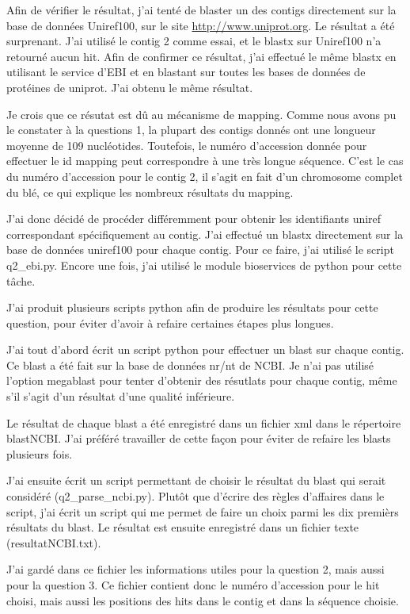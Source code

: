 \documentclass[10.9pt]{article} %
\begin{document}
Afin de vérifier le résultat, j'ai tenté de blaster un des contigs directement sur la base de données Uniref100,
sur le site \url{http://www.uniprot.org}. Le résultat a été surprenant. J'ai utilisé le contig 2 comme essai,
et le blastx sur Uniref100 n'a retourné aucun hit. Afin de confirmer ce résultat, j'ai effectué le même blastx
en utilisant le service d'EBI et en blastant sur toutes les bases de données de protéines de uniprot. J'ai obtenu
le même résultat.

Je crois que ce résutat est dû au mécanisme de mapping. Comme nous avons pu le constater à la questions 1,
la plupart des contigs donnés ont une longueur moyenne de 109 nucléotides. Toutefois, le numéro d'accession
donnée pour effectuer le id mapping peut correspondre à une très longue séquence. C'est le cas du numéro
d'accession pour le contig 2, il s'agit en fait d'un chromosome complet du blé, ce qui explique les nombreux
résultats du mapping.

J'ai donc décidé de procéder différemment pour obtenir les identifiants uniref correspondant spécifiquement au contig.
J'ai effectué un blastx directement sur la base de données uniref100 pour chaque contig. Pour ce faire, j'ai utilisé
le script q2_ebi.py. Encore une fois, j'ai utilisé le module bioservices de python pour cette tâche.



J'ai produit plusieurs scripts python afin de produire les résultats pour cette question, pour éviter
d'avoir à refaire certaines étapes plus longues.

J'ai tout d'abord écrit un script python pour effectuer un blast sur chaque contig. Ce blast a été fait
sur la base de données nr/nt de NCBI. Je n'ai pas utilisé l'option megablast pour tenter d'obtenir
des résutlats pour chaque contig, même s'il s'agit d'un résultat d'une qualité inférieure.

Le résultat de chaque blast a été enregistré dans un fichier xml dans le répertoire blastNCBI. J'ai préféré
travailler de cette façon pour éviter de refaire les blasts plusieurs fois.

J'ai ensuite écrit un script permettant de choisir le résultat du blast qui serait considéré (q2\_parse\_ncbi.py). Plutôt que d'écrire
des règles d'affaires dans le script, j'ai écrit un script qui me permet de faire un choix parmi les dix premièrs
résultats du blast. Le résultat est ensuite enregistré dans un fichier texte (resultatNCBI.txt).

J'ai gardé dans ce fichier les informations utiles pour la question 2, mais aussi pour la question 3. Ce fichier contient donc
le numéro d'accession pour le hit choisi, mais aussi les positions des hits dans le contig et dans la séquence choisie.
\end{document}
